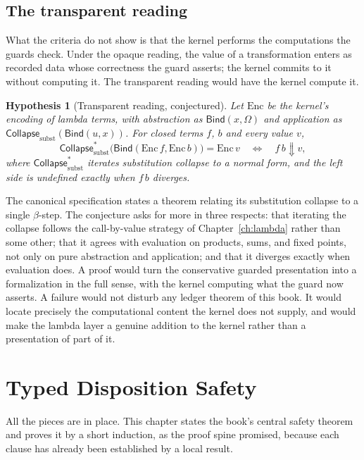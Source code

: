 \documentclass[11pt,openany]{book}
\newtheorem{hypothesis}[theorem]{Hypothesis}
\theoremstyle{remark}
\newcommand{\Bind}{\mathsf{Bind}}
\newcommand{\Collapse}{\mathsf{Collapse}}
\begin{document}
\section{The transparent reading}

What the criteria do not show is that the kernel performs the
computations the guards check. Under the opaque reading, the value of a
transformation enters as recorded data whose correctness the guard
asserts; the kernel commits to it without computing it. The transparent
reading would have the kernel compute it.

\begin{hypothesis}[Transparent reading, conjectured]\label{hyp:transparent}
Let $\mathrm{Enc}$ be the kernel's encoding of lambda terms, with
abstraction as $\Bind(x,\Omega)$ and application as
$\Collapse_{\mathrm{subst}}(\Bind(u,x))$. For closed terms $f$, $b$ and
every value $v$,
\[
\Collapse_{\mathrm{subst}}^{*}\bigl(\Bind(\mathrm{Enc}\,f,\mathrm{Enc}\,b)\bigr)
=\mathrm{Enc}\,v
\quad\Longleftrightarrow\quad f\,b\Downarrow v,
\]
where $\Collapse^{*}_{\mathrm{subst}}$ iterates substitution collapse to
a normal form, and the left side is undefined exactly when $f\,b$
diverges.
\end{hypothesis}

The canonical specification states a theorem relating its substitution
collapse to a single $\beta$-step. The conjecture asks for more in three
respects: that iterating the collapse follows the call-by-value strategy
of Chapter~\ref{ch:lambda} rather than some other; that it agrees with
evaluation on products, sums, and fixed points, not only on pure
abstraction and application; and that it diverges exactly when
evaluation does. A proof would turn the conservative guarded presentation
into a formalization in the full sense, with the kernel computing what the
guard now asserts. A failure would not disturb any ledger theorem of this
book. It would locate precisely the computational content the kernel does
not supply, and would make the lambda layer a genuine addition to the
kernel rather than a presentation of part of it.

\chapter{Typed Disposition Safety}
\label{ch:typedsafety}

All the pieces are in place. This chapter states the book's central safety
theorem and proves it by a short induction, as the proof spine promised,
because each clause has already been established by a local result.
\end{document}
